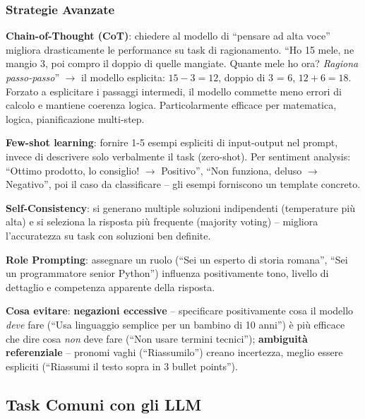\documentclass[12pt,a4paper]{article}
\begin{document}
\subsubsection{Strategie Avanzate}

\begin{examplebox}
\textbf{Chain-of-Thought (CoT)}: chiedere al modello di ``pensare ad alta voce'' migliora drasticamente le performance su task di ragionamento. ``Ho 15 mele, ne mangio 3, poi compro il doppio di quelle mangiate. Quante mele ho ora? \emph{Ragiona passo-passo}'' $\to$ il modello esplicita: $15-3=12$, doppio di 3 = 6, $12+6=18$. Forzato a esplicitare i passaggi intermedi, il modello commette meno errori di calcolo e mantiene coerenza logica. Particolarmente efficace per matematica, logica, pianificazione multi-step.

\textbf{Few-shot learning}: fornire 1-5 esempi espliciti di input-output nel prompt, invece di descrivere solo verbalmente il task (zero-shot). Per sentiment analysis: ``Ottimo prodotto, lo consiglio! $\to$ Positivo'', ``Non funziona, deluso $\to$ Negativo'', poi il caso da classificare -- gli esempi forniscono un template concreto.

\textbf{Self-Consistency}: si generano multiple soluzioni indipendenti (temperature pi\`u alta) e si seleziona la risposta pi\`u frequente (majority voting) -- migliora l'accuratezza su task con soluzioni ben definite.

\textbf{Role Prompting}: assegnare un ruolo (``Sei un esperto di storia romana'', ``Sei un programmatore senior Python'') influenza positivamente tono, livello di dettaglio e competenza apparente della risposta.
\end{examplebox}

\textbf{Cosa evitare}: \textbf{negazioni eccessive} -- specificare positivamente cosa il modello \emph{deve} fare (``Usa linguaggio semplice per un bambino di 10 anni'') \`e pi\`u efficace che dire cosa \emph{non} deve fare (``Non usare termini tecnici''); \textbf{ambiguit\`a referenziale} -- pronomi vaghi (``Riassumilo'') creano incertezza, meglio essere espliciti (``Riassumi il testo sopra in 3 bullet points'').

\subsection{Task Comuni con gli LLM}
\end{document}
